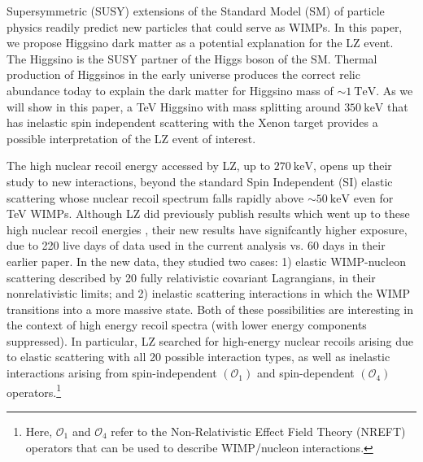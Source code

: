 \documentclass[
aps,
prl,
reprint,
superscriptaddress,
nofootinbib,
nobibnotes
]{revtex4-2}
\begin{document}
Supersymmetric (SUSY) extensions of the Standard Model (SM) of particle physics readily predict new particles that could serve as WIMPs.
In this paper, we propose Higgsino dark matter as a potential explanation for the LZ event.
The Higgsino is the SUSY partner of the Higgs boson of the SM.
Thermal production of Higgsinos in the early  universe produces  the correct relic abundance today to explain the dark matter for 
Higgsino mass of $\sim1\ \mathrm{TeV}$.  As we will show in this paper, a TeV Higgsino with mass splitting around $350\ \mathrm{keV}$ that has inelastic spin independent scattering with the Xenon target provides a possible interpretation of the LZ event of interest. 


The high nuclear recoil energy accessed by LZ, up to $270\ \mathrm{keV}$,
opens up their study to new interactions, beyond the standard Spin Independent (SI) elastic scattering whose nuclear recoil spectrum falls rapidly above $\sim50~\mathrm{keV}$
even for TeV WIMPs.  
Although LZ did previously publish results which went up to these high nuclear recoil energies \cite{LZ:2023lvz},
their new results have signifcantly higher exposure, due to 
220 live days of data used in the current analysis vs. 60 days in their earlier paper.
In the new data, they studied two cases: 1) elastic WIMP-nucleon scattering described by 20 fully relativistic covariant Lagrangians, in their nonrelativistic limits; and 2) inelastic scattering interactions in which the WIMP transitions into a more massive state.
Both of these possibilities are interesting in the context of high energy recoil spectra (with lower energy components suppressed).
In particular, LZ searched for high-energy nuclear recoils arising due to elastic scattering with all 20 possible interaction types, as well as inelastic interactions arising from spin-independent $(\mathcal{O}_1)$ and spin-dependent $(\mathcal{O}_4)$ operators.\footnote{Here, $\mathcal{O}_1$ and $\mathcal{O}_4$ refer to the Non-Relativistic Effect Field Theory (NREFT) operators that can be used to describe WIMP/nucleon interactions.}
\end{document}
